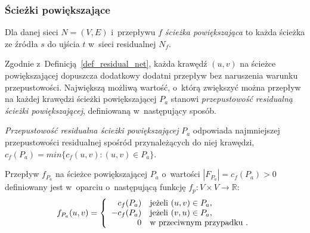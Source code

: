 \subsubsection{\textbf{Ścieżki powiększające}}
\par{
  \begin{definition}
    Dla danej sieci $N=(V,E)$ i~przepływu $f$ \emph{ścieżka powiększająca} to każda ścieżka ze źródła $s$ do ujścia $t$ w~sieci residualnej $N_f$.
  \end{definition}
  Zgodnie z~Definicją~\ref{def_residual_net}, każda krawędź $(u, v)$ na ścieżce powiększającej dopuszcza dodatkowy dodatni przepływ bez naruszenia warunku przepustowości.
  Największą możliwą wartość, o~którą zwiększyć można przepływ na każdej krawędzi ścieżki powiększającej $P_a$ stanowi \emph{przepustowość residualną ścieżki powiększającej}, definiowaną w~następujący sposób.
  \begin{definition}
    \emph{Przepustowość residualna ścieżki powiększającej} $P_a$ odpowiada najmniejszej przepustowości residualnej spośród przynależących do niej krawędzi, $c_f(P_a) = min\{c_f(u, v):(u, v)\in P_a\}$.
  \end{definition}
  \begin{definition}
    Przepływ $f_{P_a}$ na ścieżce powiększającej $P_a$ o~wartości $|F_{P_a}| = c_f(P_a) > 0$ definiowany jest w~oparciu o~następującą funkcję $f_p: V \times V \rightarrow \mathbb{R}$: 
    \begin{equation*}
    f_{P_a}(u, v) = \left\{
    \begin{array}{rl}
    c_f(P_a) & \textnormal{jeżeli } (u, v) \in P_a,\\
    -c_f(P_a) & \textnormal{jeżeli } (v, u) \in P_a,\\
    0 & \textnormal{w przeciwnym przypadku }.
    \end{array} \right.
    \end{equation*}
  \end{definition}
}
